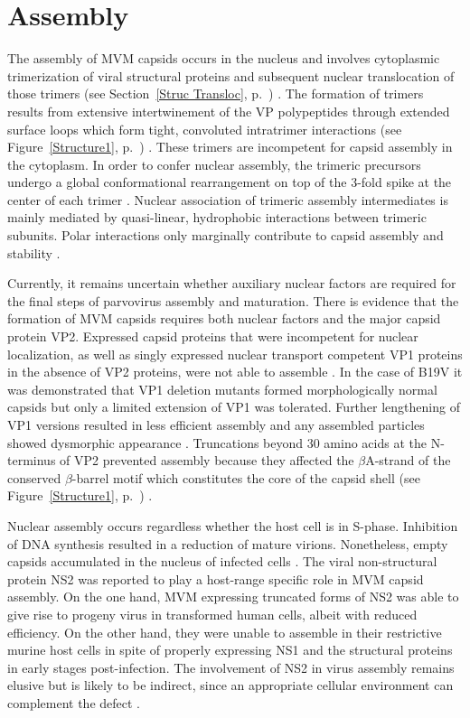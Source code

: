 \section{Assembly}
\label{Assembly}

The assembly of MVM capsids occurs in the nucleus and involves cytoplasmic trimerization of viral structural proteins and subsequent nuclear translocation of those trimers (see Section~\ref{Struc Transloc}, p.~\pageref{Struc Transloc}) \cite{pmid16469332}. The formation of trimers results from extensive intertwinement of the VP polypeptides through extended surface loops which form tight, convoluted intratrimer interactions (see Figure~\ref{Structure1}, p.~\pageref{Structure1}) \cite{pmid15299974, pmid21867712}. These trimers are incompetent for capsid assembly in the cytoplasm. In order to confer nuclear assembly, the trimeric precursors undergo a global conformational rearrangement on top of the 3-fold spike at the center of each trimer \cite{pmid16469332, pmid12552010, pmid17626084}. Nuclear association of trimeric assembly intermediates is mainly mediated by quasi-linear, hydrophobic interactions between trimeric subunits. Polar interactions only marginally contribute to capsid assembly and stability \cite{pmid14981262}.     

Currently, it remains uncertain whether auxiliary nuclear factors are required for the final steps of parvovirus assembly and maturation. There is evidence that the formation of MVM capsids requires both nuclear factors and the major capsid protein VP2. Expressed capsid proteins that were incompetent for nuclear localization, as well as singly expressed nuclear transport competent VP1 proteins in the absence of VP2 proteins, were not able to assemble \cite{pmid12072505, pmid10438891, pmid10729155}. In the case of B19V it was demonstrated that VP1 deletion mutants formed morphologically normal capsids but only a limited extension of VP1 was tolerated. Further lengthening of VP1 versions resulted in less efficient assembly and any assembled particles showed dysmorphic appearance \cite{pmid8207846}. Truncations beyond 30 amino acids at the N-terminus of VP2 prevented assembly because they affected the $\beta$A-strand of the conserved $\beta$-barrel motif which constitutes the core of the capsid shell (see Figure~\ref{Structure1}, p.~\pageref{Structure1}) \cite{pmid7666560}.     


Nuclear assembly occurs regardless whether the host cell is in S-phase. Inhibition of DNA synthesis resulted in a reduction of mature virions. Nonetheless, empty capsids accumulated in the nucleus of infected cells \cite{pmid559779, assembly}. The viral non-structural protein NS2 was reported to play a host-range specific role in MVM capsid assembly. On the one hand, MVM expressing truncated forms of NS2 was able to give rise to progeny virus in transformed human cells, albeit with reduced efficiency. On the other hand, they were unable to assemble in their restrictive murine host cells in spite of properly expressing NS1 and the structural proteins in early stages post-infection. The involvement of NS2 in virus assembly remains elusive but is likely to be indirect, since an appropriate cellular environment can complement the defect \cite{pmid9168889}.        


